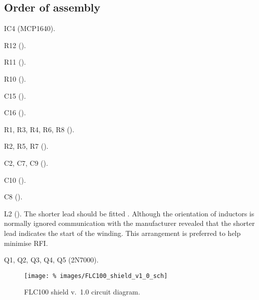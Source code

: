 \subsection{Order of assembly}
\begin{buildorder}
\item IC4 (MCP1640).
\item R12 ().
\item R11 ().
\item R10 ().
\item C15 ().
\item C16 ().
\item R1, R3, R4, R6, R8 ().
\item R2, R5, R7 ().
\item C2, C7, C9 (). 
\item C10 ().
\item C8 ().
\item L2 (). The shorter lead should be fitted
  \todo[\ldots]. Although the orientation of inductors is normally
  ignored communication with the manufacturer revealed that the
  shorter lead indicates the start of the winding. This arrangement is
  preferred to help minimise RFI.
\item
\item
\item
\item
\item
\item Q1, Q2, Q3, Q4, Q5 (2N7000).
\end{buildorder}

\begin{landscape}
  \begin{figure}[p]
    \centering
    \texttt{[image: \%
      images/FLC100\_shield\_v1\_0\_sch]}
    \caption{FLC100 shield v.~1.0 circuit diagram.}
    \label{fig:flc100-shield-v1.0-cct-diag}
  \end{figure}
\end{landscape}

